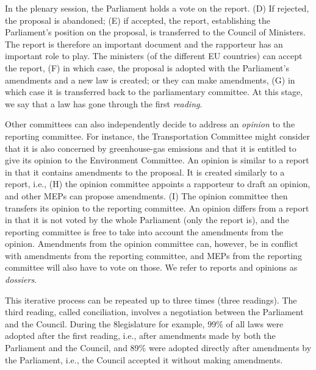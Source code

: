 In the plenary session, the Parliament holds a vote on the report.
(D) If rejected, the proposal is abandoned; (E) if accepted, the report, establishing the Parliament's position on the proposal, is transferred to the Council of Ministers.
The report is therefore an important document and the rapporteur has an important role to play.
The ministers (of the different EU countries) can accept the report, (F) in which case, the proposal is adopted with the Parliament's amendments and a new law is created; or they can make amendments, (G) in which case it is transferred back to the parliamentary committee.
At this stage, we say that a law has gone through the first \textit{reading}.

Other committees can also independently decide to address an \textit{opinion} to the reporting committee.
For instance, the Transportation Committee might consider that it is also concerned by greenhouse-gas emissions and that it is entitled to give its opinion to the Environment Committee.
An opinion is similar to a report in that it contains amendments to the proposal.
It is created similarly to a report, i.e., (H) the opinion committee appoints a rapporteur to draft an opinion, and other MEPs can propose amendments.
(I) The opinion committee then transfers its opinion to the reporting committee.
An opinion differs from a report in that it is not voted by the whole Parliament (only the report is), and the reporting committee is free to take into account the amendments from the opinion.
Amendments from the opinion committee can, however, be in conflict with amendments from the reporting committee, and MEPs from the reporting committee will also have to vote on those.
We refer to reports and opinions as \textit{dossiers}.

This iterative process can be repeated up to three times (three readings).
The third reading, called conciliation, involves a negotiation between the Parliament and the Council.
During the 8\th legislature for example, 99\% of all laws were adopted after the first reading, i.e., after amendments made by both the Parliament and the Council, and 89\% were adopted directly after amendments by the Parliament, i.e., the Council accepted it without making amendments.

